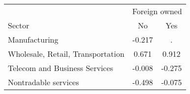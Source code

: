 \begin{tabular}{lcc}
\toprule
 & \multicolumn{2}{c}{Foreign owned} \\
\cmidrule(lr){2-3}
Sector & No & Yes \\
\midrule
Manufacturing & -0.217 & . \\
Wholesale, Retail, Transportation & 0.671 & 0.912 \\
Telecom and Business Services & -0.008 & -0.275 \\
Nontradable services & -0.498 & -0.075 \\
\bottomrule
\end{tabular}
